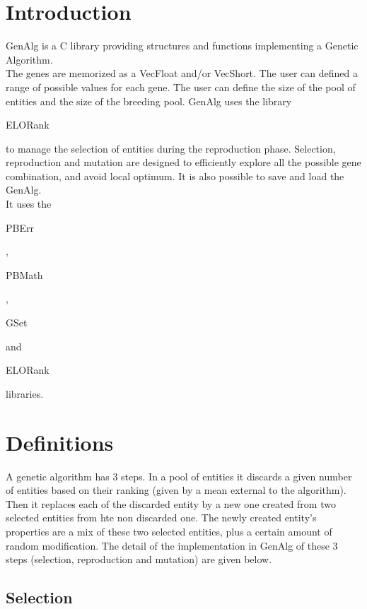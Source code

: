 \section*{Introduction}

GenAlg is a C library providing structures and functions implementing a Genetic Algorithm.\\ 

The genes are memorized as a VecFloat and/or VecShort. The user can defined a range of possible values for each gene. The user can define the size of the pool of entities and the size of the breeding pool. GenAlg uses the library \begin{ttfamily}ELORank\end{ttfamily} to manage the selection of entities during the reproduction phase. Selection, reproduction and mutation are designed to efficiently explore all the possible gene combination, and avoid local optimum. It is also possible to save and load the GenAlg.\\

It uses the \begin{ttfamily}PBErr\end{ttfamily}, \begin{ttfamily}PBMath\end{ttfamily}, \begin{ttfamily}GSet\end{ttfamily} and \begin{ttfamily}ELORank\end{ttfamily} libraries.\\

\section{Definitions}

A genetic algorithm has 3 steps. In a pool of entities it discards a given number of entities based on their ranking (given by a mean external to the algorithm). Then it replaces each of the discarded entity by a new one created from two selected entities from hte non discarded one. The newly created entity's properties are a mix of these two selected entities, plus a certain amount of random modification. The detail of the implementation in GenAlg of these 3 steps (selection, reproduction and mutation) are given below.\\

\subsection{Selection}

